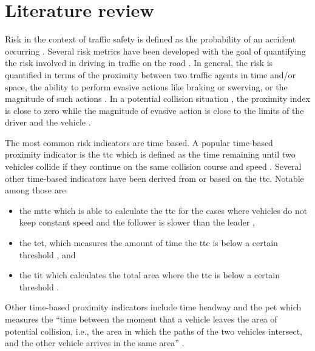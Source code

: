 \section{Literature review}
\label{sec:literature review}

Risk in the context of traffic safety is defined as the probability of an accident occurring \autocite{hakkert2002uses}.
Several risk metrics have been developed with the goal of quantifying the risk involved in driving in traffic on the road \autocite{minderhoud2001extended, ozbay2008derivation, cunto2009simulated, laureshyn2010evaluation}.
In general, the risk is quantified in terms of the proximity between two traffic agents in time and/or space, the ability to perform evasive actions like braking or swerving, or the magnitude of such actions \autocite{shi2018key,zheng2020modeling}. 
In a potential collision situation , the proximity index is close to zero while the magnitude of evasive action is close to the limits of the driver and the vehicle \autocite{zheng2020modeling}. 

The most common risk indicators are time based. 
A popular time-based proximity indicator is the \ac{ttc} which is defined as the time remaining until two vehicles collide if they continue on the same collision course and speed \autocite{hayward1972near}. 
Several other time-based indicators have been derived from or based on the \ac{ttc}. 
Notable among those are 
\begin{itemize}
    \item the \ac{mttc} which is able to calculate the \ac{ttc} for the cases where vehicles do not keep constant speed and the follower is slower than the leader \autocite{ozbay2008derivation},
    \item the \ac{tet}, which measures the amount of time the \ac{ttc} is below a certain threshold \autocite{minderhoud2001extended}, and
    \item the \ac{tit} which calculates the total area where the \ac{ttc} is below a certain threshold  \autocite{minderhoud2001extended}. 
\end{itemize}
Other time-based proximity indicators include time headway and the \ac{pet} which measures the ``time between the moment that a vehicle leaves the area of potential collision, i.e., the area in which the paths of the two vehicles intersect, and the other vehicle arrives in the same area'' \autocite{mahmud2017application}. 

